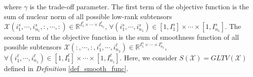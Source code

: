 \documentclass[12pt, draftcls, onecolumn]{IEEEtran}
\theoremstyle{plain}
\theoremstyle{definition}
\theoremstyle{remark}
\newcommand{\nt}[1]{\textcolor{red}{\textbf{[#1]}}}
\begin{document}
where $\gamma$ is the trade-off parameter.
The first term of the objective function is the sum of nuclear norm of all possible low-rank subtensors $\mathcal{X}(i^s_{1},\cdots,i^s_{n_1},:,\cdots,:)\in\mathbb{R}^{I^{\ell}_{1}\times\cdots\times I^{\ell}_{n_2}}$, $\forall (i^s_{1},\cdots,i^s_{n_1})\in[1,I^s_1]\times\cdots\times [1,I^s_{n_1}]$.
The second term of the objective function is the sum of smoothness function of all possible subtensors $\mathcal{X}(:,\cdots,:,i^\ell_{1},\cdots,i^\ell_{n_2})\in\mathbb{R}^{I^{s}_{1}\times\cdots\times I^{s}_{n_2}}$, $\forall (i^{\ell}_{1},\cdots,i^{\ell}_{n_1})\in[1,I^{\ell}_1]\times\cdots\times [1,I^{\ell}_{n_1}]$.
Here, we consider $S(\mathcal{X})=GLTV(\mathcal{X})$ defined in \textit{Definition} \ref{def_smooth_func}.
\end{document}
